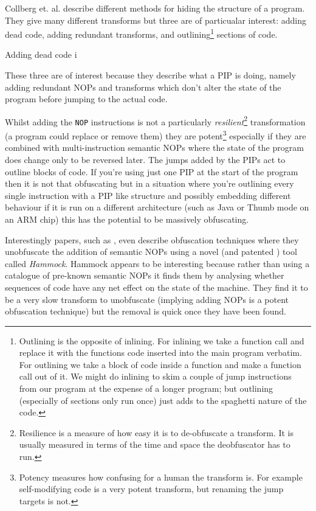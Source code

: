 \documentclass[]{book}
\begin{document}
Collberg et. al. \autocite{Collberg:1997vt} describe different methods
for hiding the structure of a program. They give many different
transforms but three are of particualar interest: adding dead code,
adding redundant transforms, and outlining\footnote{Outlining is the
  opposite of inlining. For inlining we take a function call and replace
  it with the functions code inserted into the main program verbatim.
  For outlining we take a block of code inside a function and make a
  function call out of it. We might do inlining to skim a couple of jump
  instructions from our program at the expense of a longer program; but
  outlining (especially of sections only run once) just adds to the
  spaghetti nature of the code.} sections of code.

Adding dead code i

These three are of interest because they describe what a PIP is doing,
namely adding redundant NOPs and transforms which don't alter the state
of the program before jumping to the actual code.

Whilst adding the \lstinline!NOP! instructions is not a particularly
\emph{resilient}\footnote{Resilience is a measure of how easy it is to
  de-obfuscate a transform. It is usually measured in terms of the time
  and space the deobfuscator has to run.} transformation (a program
could replace or remove them) they are potent\footnote{Potency measures
  how confusing for a human the transform is. For example self-modifying
  code is a very potent transform, but renaming the jump targets is not.}
especially if they are combined with multi-instruction semantic NOPs
where the state of the program does change only to be reversed later.
The jumps added by the PIPs act to outline blocks of code. If you're
using just one PIP at the start of the program then it is not that
obfuscating but in a situation where you're outlining every single
instruction with a PIP like structure and possibly embedding different
behaviour if it is run on a different architecture (such as Java or
Thumb mode on an ARM chip) this has the potential to be massively
obfuscating.

Interestingly papers, such as
\autocite{Christodorescu:2005vh}\autocite{Christodorescu:2005vf}, even
describe obfuscation techniques where they unobfuscate the addition of
semantic NOPs using a novel (and patented
\autocite{Christodorescu:2009wo}) tool called \emph{Hammock}. Hammock
appears to be interesting because rather than using a catalogue of
pre-known semantic NOPs it finds them by analysing whether sequences of
code have any net effect on the state of the machine. They find it to be
a very slow transform to unobfuscate (implying adding NOPs is a potent
obfuscation technique) but the removal is quick once they have been
found.
\end{document}
